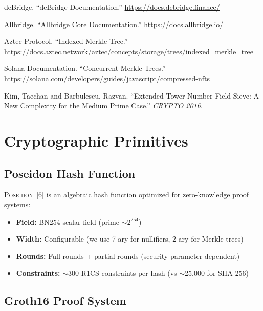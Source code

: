 \documentclass[11pt,a4paper,twoside]{article}
\newcommand{\poseidon}{\textsc{Poseidon}}
\begin{document}
\begin{enumerate}[label={[\arabic*]}]
    \item \label{debridge} deBridge. ``deBridge Documentation.'' \url{https://docs.debridge.finance/}
    
    \item \label{allbridge} Allbridge. ``Allbridge Core Documentation.'' \url{https://docs.allbridge.io/}
    
    \item \label{imt} Aztec Protocol. ``Indexed Merkle Tree.'' \url{https://docs.aztec.network/aztec/concepts/storage/trees/indexed_merkle_tree}
    
    \item \label{cmt} Solana Documentation. ``Concurrent Merkle Trees.'' \url{https://solana.com/developers/guides/javascript/compressed-nfts}
    
    \item \label{kim-barbulescu} Kim, Taechan and Barbulescu, Razvan. ``Extended Tower Number Field Sieve: A New Complexity for the Medium Prime Case.'' \textit{CRYPTO 2016}.
\end{enumerate}

\newpage
\appendix
\section{Cryptographic Primitives}
\label{app:crypto}

\subsection{Poseidon Hash Function}

\poseidon{}~[6] is an algebraic hash function optimized for zero-knowledge proof systems:
\begin{itemize}
    \item \textbf{Field:} BN254 scalar field (prime $\sim 2^{254}$)
    \item \textbf{Width:} Configurable (we use 7-ary for nullifiers, 2-ary for Merkle trees)
    \item \textbf{Rounds:} Full rounds + partial rounds (security parameter dependent)
    \item \textbf{Constraints:} $\sim$300 R1CS constraints per hash (vs $\sim$25,000 for SHA-256)
\end{itemize}

\subsection{Groth16 Proof System}
\end{document}
